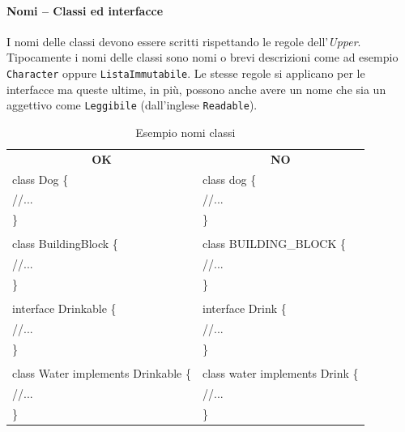 \paragraph{Nomi – Classi ed interfacce}
I nomi delle classi devono essere scritti rispettando le regole dell’\emph{Upper}. Tipocamente i nomi delle classi sono nomi o brevi descrizioni come ad esempio \texttt{Character} oppure \texttt{ListaImmutabile}. Le stesse regole si applicano per le interfacce ma queste ultime, in più, possono anche avere un nome che sia un aggettivo come \texttt{Leggibile} (dall’inglese \texttt{Readable}).
\begin{table} [H]
	\begin{center}
		\begin{tabular}{  l | l }
			\multicolumn{1}{c}{\textbf{OK}}&\multicolumn{1}{c}{\textbf{NO}}\\ 
			
			class Dog \{
			& class dog \{ \\
			\hspace{0.5cm}//...
			& \hspace{0.5cm}//... \\
			\}
			& \} \\
			&\\
			class BuildingBlock \{
			& class BUILDING\_BLOCK \{\\
			\hspace{0.5cm}//...
			& \hspace{0.5cm}//...\\
			\}
			&\}\\
			&\\
			interface Drinkable \{
			& interface Drink \{\\
			\hspace{0.5cm}//...
			& \hspace{0.5cm}//...\\
			\}
			& \}\\
			&\\
			class Water implements Drinkable \{
			& class water implements Drink \{ \\
			\hspace{0.5cm}//...									& \hspace{0.5cm}//...\\
			\}
			& \}\\		
		\end{tabular}
	\end{center}
	\caption{Esempio nomi classi}
\end{table}
	

